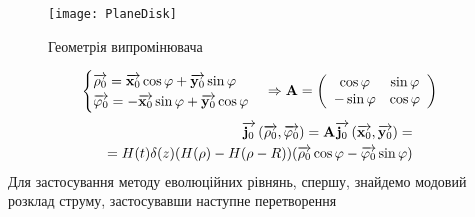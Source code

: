 \begin{figure}[htbp] \begin{center}
\texttt{[image: PlaneDisk]}
\caption{Геометрія випромінювача} \label{fig:pdisk}
\end{center} \end{figure}
%
\textcolor{blue} { \begin{equation*} \begin{aligned}
\begin{cases}
\overrightarrow{\mathbf \rho_0} = \overrightarrow{\mathbf x_0} \cos \varphi + \overrightarrow{\mathbf y_0} \sin \varphi \\
\overrightarrow{\mathbf \varphi_0} = - \overrightarrow{\mathbf x_0} \sin \varphi + \overrightarrow{\mathbf y_0} \cos \varphi
\end{cases} \Rightarrow \mathbf{A} = \left( \begin{array}{cc}
\cos \varphi & \sin \varphi \\
- \sin \varphi & \cos \varphi
\end{array} \right)
\end{aligned} \end{equation*} }
%
\textcolor{blue} { \begin{equation*} \begin{aligned}
\overrightarrow{\mathbf j_0} \left( \overrightarrow{\mathbf \rho_0}, \overrightarrow{\mathbf \varphi_0} \right) = 
\mathbf{A} \overrightarrow{\mathbf j_0} \left( \overrightarrow{\mathbf x_0}, \overrightarrow{\mathbf y_0} \right) = \\
= H(t) \delta(z) (  H(\rho) - H(\rho - R) ) 
( \overrightarrow{\mathbf \rho_0} \cos \varphi - \overrightarrow{\mathbf \varphi_0} \sin \varphi )
\end{aligned} \end{equation*} }
%
Для застосування методу еволюційних рівнянь, спершу, знайдемо модовий 
розклад струму, застосувавши наступне перетворення

